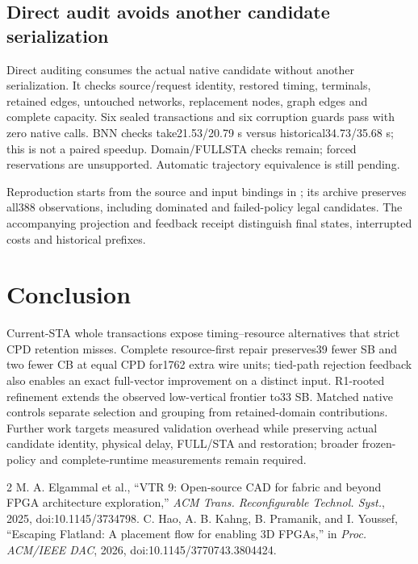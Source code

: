 \documentclass[conference,10pt]{IEEEtran}
\begin{document}
\subsection{Direct audit avoids another candidate serialization}
Direct auditing consumes the actual native candidate without another serialization. It checks source/request identity, restored timing, terminals, retained edges, untouched networks, replacement nodes, graph edges and complete capacity. Six sealed transactions and six corruption guards pass with zero native calls. BNN checks take21.53/20.79 s versus historical34.73/35.68 s; this is not a paired speedup. Domain/FULLSTA checks remain; forced reservations are unsupported. Automatic trajectory equivalence is still pending.

Reproduction starts from the source and input bindings in ; its archive preserves all388 observations, including dominated and failed-policy legal candidates. The accompanying projection and feedback receipt distinguish final states, interrupted costs and historical prefixes.

\section{Conclusion}
Current-STA whole transactions expose timing--resource alternatives that strict CPD retention misses. Complete resource-first repair preserves39 fewer SB and two fewer CB at equal CPD for1762 extra wire units; tied-path rejection feedback also enables an exact full-vector improvement on a distinct input. R1-rooted refinement extends the observed low-vertical frontier to33 SB. Matched native controls separate selection and grouping from retained-domain contributions. Further work targets measured validation overhead while preserving actual candidate identity, physical delay, FULL/STA and restoration; broader frozen-policy and complete-runtime measurements remain required.

\begin{thebibliography}{2}
 M. A. Elgammal et al., ``VTR 9: Open-source CAD for fabric and beyond FPGA architecture exploration,'' \emph{ACM Trans. Reconfigurable Technol. Syst.}, 2025, doi:10.1145/3734798.
 C. Hao, A. B. Kahng, B. Pramanik, and I. Youssef, ``Escaping Flatland: A placement flow for enabling 3D FPGAs,'' in \emph{Proc. ACM/IEEE DAC}, 2026, doi:10.1145/3770743.3804424.
\end{thebibliography}
\end{document}
